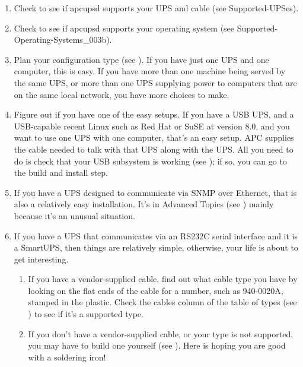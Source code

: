 \begin{enumerate}
\item Check to see if apcupsd supports your UPS and cable
   (see  
   {Supported-UPSes}).  
\item Check to see if apcupsd supports your operating system
   (see 
   {Supported-Operating-Systems_003b}).  
\item Plan your configuration type (see 
   ).  If you have just one UPS
   and one computer, this is easy.  If you have more than one machine being
   served by the same UPS, or more than one UPS supplying power to computers that
   are on the same local network, you have more choices to make.  
\item Figure out if you have one of the easy setups.  If you have a USB
   UPS, and a USB-capable recent Linux such as Red Hat or SuSE at version 8.0,
   and you want to use one UPS with one computer, that's an easy setup.  APC
   supplies the cable needed to talk with that UPS along with the UPS. All you
   need to do is check that your USB subsystem is working (see 
   ); if so, you can go to
   the build and install step.  
\item If you have a UPS designed to communicate via SNMP over Ethernet, that
   is also a relatively easy installation. It's in Advanced Topics (see 
   ) mainly because it's an
   unusual situation.  
\item If you have a UPS that communicates via an RS232C serial interface and
   it is a SmartUPS, then things are relatively simple, otherwise, your life is
   about to get interesting.  

\begin{enumerate}
\item If you have a vendor-supplied cable, find out what cable type you have
   by looking on the flat ends of the cable for a number, such as 940-0020A,
   stamped in the plastic.  Check the cables column of the table of types (see 
   ) to see if it's a supported
   type.  
\item If you don't have a vendor-supplied cable, or your type is not
   supported, you may have to build one yourself (see 
   ).  Here is hoping you are good with a
   soldering iron!  
\end{enumerate}


\end{enumerate}
